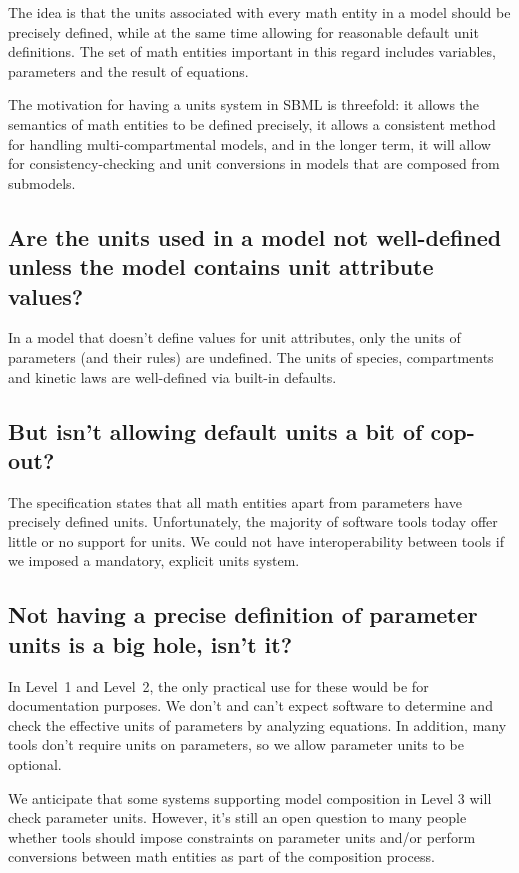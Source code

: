 \documentclass{sbmlfaq}
\begin{document}
The idea is that the units associated with every math entity in a model
should be precisely defined, while at the same time allowing for reasonable
default unit definitions.  The set of math entities important in this
regard includes variables, parameters and the result of equations.

The motivation for having a units system in SBML is threefold: it allows
the semantics of math entities to be defined precisely, it allows a
consistent method for handling multi-compartmental models, and in the
longer term, it will allow for consistency-checking and unit conversions in
models that are composed from submodels.


\subsection{Are the units used in a model not well-defined unless the model contains unit attribute values?}

In a model that doesn't define values for unit attributes, only the units of
parameters (and their rules) are undefined.  The units of species,
compartments and kinetic laws are well-defined via built-in defaults.


\subsection{But isn't allowing default units a bit of cop-out?}

The specification states that all math entities apart from parameters have
precisely defined units.  Unfortunately, the majority of software tools
today offer little or no support for units.  We could not have
interoperability between tools if we imposed a mandatory, explicit units
system.


\subsection{Not having a precise definition of parameter units is a big hole, isn't it?}

In Level~1 and Level~2, the only practical use for these would be for documentation purposes.
We don't and can't expect software to determine and check the effective units of parameters by analyzing
equations.  In addition, many tools don't require units on parameters, so we allow parameter
units to be optional.

We anticipate that some systems supporting model composition in Level 3 will check parameter units.
However, it's still an
open question to many people whether tools should impose constraints
on parameter units and/or perform conversions between math entities
as part of the composition process.
\end{document}
